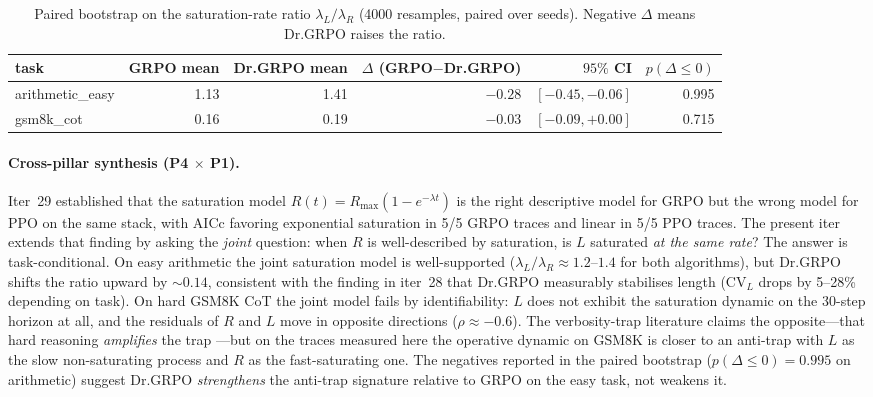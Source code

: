 \begin{table}[t]
\centering
\footnotesize
\setlength{\tabcolsep}{4pt}
\caption{Paired bootstrap on the saturation-rate ratio
$\lambda_L / \lambda_R$ (4000 resamples, paired over seeds). Negative
$\Delta$ means Dr.GRPO raises the ratio.}
\label{tab:length-iter36-cross}
\begin{tabular}{lrrrrr}
\toprule
task & GRPO mean & Dr.GRPO mean & $\Delta$ (GRPO$-$Dr.GRPO) &
$95\%$ CI & $p(\Delta \le 0)$ \\
\midrule
arithmetic\_easy & 1.13 & 1.41 & $-0.28$ & $[-0.45, -0.06]$ & 0.995 \\
gsm8k\_cot       & 0.16 & 0.19 & $-0.03$ & $[-0.09, +0.00]$ & 0.715 \\
\bottomrule
\end{tabular}
\end{table}

\paragraph{Cross-pillar synthesis (P4 $\times$ P1).}
Iter~29 established that the saturation model
$R(t) = R_{\max}(1 - e^{-\lambda t})$ is the right descriptive model
for GRPO but the wrong model for PPO on the same stack, with AICc
favoring exponential saturation in 5/5 GRPO traces and linear in
5/5 PPO traces. The present iter extends that finding by asking the
\emph{joint} question: when $R$ is well-described by saturation, is
$L$ saturated \emph{at the same rate}? The answer is task-conditional.
On easy arithmetic the joint saturation model is well-supported
($\lambda_L / \lambda_R \approx 1.2$--$1.4$ for both algorithms), but
Dr.GRPO shifts the ratio upward by $\sim 0.14$, consistent with the
finding in iter~28 that Dr.GRPO measurably stabilises length
(CV$_L$ drops by 5--28\% depending on task). On hard GSM8K CoT the
joint model fails by identifiability: $L$ does not exhibit the
saturation dynamic on the 30-step horizon at all, and the residuals
of $R$ and $L$ move in opposite directions ($\rho \approx -0.6$).
The verbosity-trap literature claims the opposite---that hard
reasoning \emph{amplifies} the trap \cite{singhal2023drdrpo}---but on
the traces measured here the operative dynamic
on GSM8K is closer to an anti-trap with $L$ as the slow
non-saturating process and $R$ as the fast-saturating one. The
negatives reported in the paired bootstrap ($p(\Delta \le 0) = 0.995$
on arithmetic) suggest Dr.GRPO \emph{strengthens} the anti-trap
signature relative to GRPO on the easy task, not weakens it.

